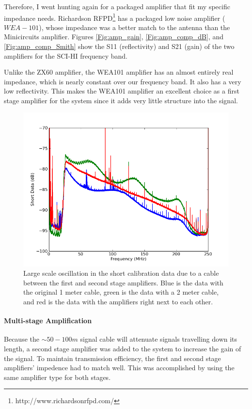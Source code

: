 Therefore, I went hunting again for a packaged amplifier that fit my specific impedance needs. Richardson RFPD\footnote{http://www.richardsonrfpd.com/} has a packaged low noise amplifier ($WEA-101$), whose impedance was a better match to the antenna than the Minicircuits amplifier. Figures \ref{Fig:amp_gain}, \ref{Fig:amp_comp_dB}, and \ref{Fig:amp_comp_Smith} show the S11 (reflectivity) and S21 (gain) of the two amplifiers for the SCI-HI frequency band. 

Unlike the ZX60 amplifier, the WEA101 amplifier has an almost entirely real impedance, which is nearly constant over our frequency band. It also has a very low reflectivity. This makes the WEA101 amplifier an excellent choice as a first stage amplifier for the system since it adds very little structure into the signal. 

\begin{figure}[htb]
\begin{center}
\includegraphics[width=0.9\linewidth]{SCIHI_system/figures/antenna_rf_cable_reflections.png}
\caption{Large scale oscillation in the short calibration data due to a cable between the first and second stage amplifiers. Blue is the data with the original 1 meter cable, green is the data with a 2 meter cable, and red is the data with the amplifiers right next to each other.}
\label{Fig:amp_reflect}
\end{center}
\end{figure}

\paragraph{Multi-stage Amplification}
Because the $\sim 50-100 m$ signal cable will attenuate signals travelling down its length, a second stage amplifier was added to the system to increase the gain of the signal. To maintain transmission efficiency, the first and second stage amplifiers' impedence had to match well. This was accomplished by using the same amplifier type for both stages. 

